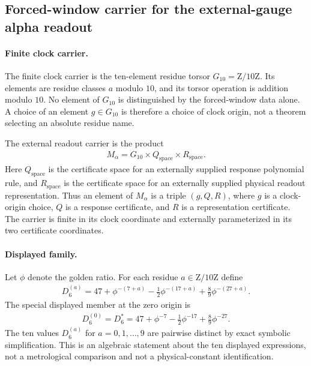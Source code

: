 
\subsection{Forced-window carrier for the external-gauge alpha readout}
\label{sec:window6-alpha-external-gauge-d6-family-theorem-a}

\paragraph{Finite clock carrier.}
The finite clock carrier is the ten-element residue torsor
$G_{10}=\mathrm{Z}/10\mathrm{Z}$.  Its elements are residue classes $a$ modulo $10$, and its torsor operation is addition modulo $10$.  No element of $G_{10}$ is distinguished by the forced-window data alone.  A choice of an element $g\in G_{10}$ is therefore a choice of clock origin, not a theorem selecting an absolute residue name.

The external readout carrier is the product
$$
\begin{aligned}
M_{\alpha}=G_{10}\times Q_{\mathrm{space}}\times R_{\mathrm{space}}.
\end{aligned}
$$
Here $Q_{\mathrm{space}}$ is the certificate space for an externally supplied response polynomial rule, and $R_{\mathrm{space}}$ is the certificate space for an externally supplied physical readout representation.  Thus an element of $M_{\alpha}$ is a triple $(g,Q,R)$, where $g$ is a clock-origin choice, $Q$ is a response certificate, and $R$ is a representation certificate.  The carrier is finite in its clock coordinate and externally parameterized in its two certificate coordinates.

\paragraph{Displayed family.}
Let $\phi$ denote the golden ratio.  For each residue $a\in \mathrm{Z}/10\mathrm{Z}$ define
$$
\begin{aligned}
D_{6}^{(a)}=47+\phi^{-(7+a)}-\frac{1}{2}\phi^{-(17+a)}+\frac{8}{9}\phi^{-(27+a)}.
\end{aligned}
$$
The special displayed member at the zero origin is
$$
\begin{aligned}
D_{6}^{(0)}=D_{6}^{*}=47+\phi^{-7}-\frac{1}{2}\phi^{-17}+\frac{8}{9}\phi^{-27}.
\end{aligned}
$$
The ten values $D_{6}^{(a)}$ for $a=0,1,\ldots,9$ are pairwise distinct by exact symbolic simplification.  This is an algebraic statement about the ten displayed expressions, not a metrological comparison and not a physical-constant identification.

